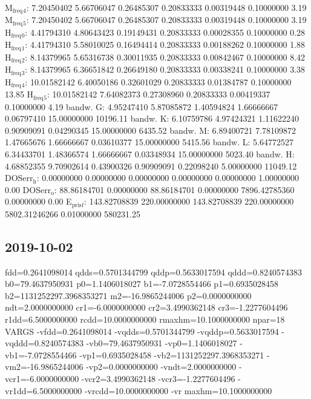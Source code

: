 \documentclass[11pt]{article}
\begin{document}
M\(_{\text{freq}}\)\(_{\text{4}}\):   7.20450402   5.66706047   0.26485307   0.20833333   0.00319448   0.10000000         3.19
M\(_{\text{freq}}\)\(_{\text{5}}\):   7.20450402   5.66706047   0.26485307   0.20833333   0.00319448   0.10000000         3.19
H\(_{\text{freq}}\)\(_{\text{0}}\):   4.41794310   4.80643423   0.19149431   0.20833333   0.00028355   0.10000000         0.28
H\(_{\text{freq}}\)\(_{\text{1}}\):   4.41794310   5.58010025   0.16494414   0.20833333   0.00188262   0.10000000         1.88
H\(_{\text{freq}}\)\(_{\text{2}}\):   8.14379965   5.65316738   0.30011935   0.20833333   0.00842467   0.10000000         8.42
H\(_{\text{freq}}\)\(_{\text{3}}\):   8.14379965   6.36651842   0.26649180   0.20833333   0.00338241   0.10000000         3.38
H\(_{\text{freq}}\)\(_{\text{4}}\):  10.01582142   6.40050186   0.32601029   0.20833333   0.01384787   0.10000000        13.85
H\(_{\text{freq}}\)\(_{\text{5}}\):  10.01582142   7.64082373   0.27308960   0.20833333   0.00419337   0.10000000         4.19
bandw. G:   4.95247410   5.87085872   1.40594824   1.66666667   0.06797410  15.00000000     10196.11
bandw. K:   6.10759786   4.97424321   1.11622240   0.90909091   0.04290345  15.00000000      6435.52
bandw. M:   6.89400721   7.78109872   1.47665676   1.66666667   0.03610377  15.00000000      5415.56
bandw. L:   5.64772527   6.34433701   1.48366574   1.66666667   0.03348934  15.00000000      5023.40
bandw. H:   4.68852355   9.70902614   0.43900326   0.90909091   0.22098240   5.00000000     11049.12
DOSerr\(_{\text{h}}\):   0.00000000   0.00000000   0.00000000   0.00000000   0.00000000   1.00000000         0.00
DOSerr\(_{\text{o}}\):  88.86184701   0.00000000  88.86184701   0.00000000 7896.42785360   0.00000000         0.00
E\(_{\text{pris}}\)\(_{\text{f}}\): 143.82708839 220.00000000 143.82708839 220.00000000 5802.31246266   0.01000000    580231.25


\subsection{2019-10-02}
\label{sec:orgc2e26a2}

 fdd=0.2641098014 qdds=0.5701344799 qddp=0.5633017594 qddd=0.8240574383 b0=79.4637950931 p0=1.1406018027 b1=-7.0728554466 p1=0.6935028458 b2=1131252297.3968353271 m2=-16.9865244006 p2=0.0000000000 ndt=2.0000000000 cr1=-6.0000000000 cr2=3.4990362148 cr3=-1.2277604496 r1dd=6.5000000000 rcdd=10.0000000000 rmaxhm=10.1000000000 npar=18 
VARGS
    -vfdd=0.2641098014 -vqdds=0.5701344799 -vqddp=0.5633017594 -vqddd=0.8240574383 -vb0=79.4637950931 -vp0=1.1406018027 -vb1=-7.0728554466 -vp1=0.6935028458 -vb2=1131252297.3968353271 -vm2=-16.9865244006 -vp2=0.0000000000 -vndt=2.0000000000 -vcr1=-6.0000000000 -vcr2=3.4990362148 -vcr3=-1.2277604496 -vr1dd=6.5000000000 -vrcdd=10.0000000000 -vr
maxhm=10.1000000000 
\end{document}
